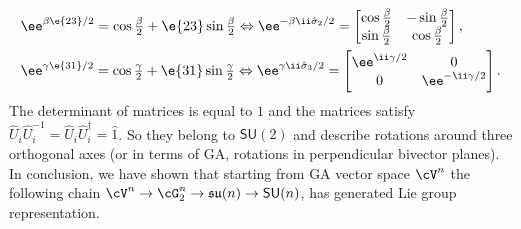 \begin{example}
\[\begin{split}
&\ee^{\beta\e{23}/2}=\cos\tfrac{\beta}{2}+\e{23}\sin\tfrac{\beta}{2}\Leftrightarrow\ee^{-\beta\ii\hat{\sigma}_2/2}=
\begin{bmatrix}\cos\tfrac{\beta}{2}&-\sin\tfrac{\beta}{2}\\\sin\tfrac{\beta}{2}&\cos\tfrac{\beta}{2}\end{bmatrix},\\
&\ee^{\gamma\e{31}/2}=\cos\tfrac{\gamma}{2}+\e{31}\sin\tfrac{\gamma}{2}\Leftrightarrow\ee^{\gamma\ii\hat{\sigma}_3/2}=
\begin{bmatrix}\ee^{\ii\gamma/2}&0\\0&\ee^{-\ii\gamma/2}\end{bmatrix}.
\end{split}\]
The determinant of matrices
is equal to $1$ and the matrices satisfy
$\hat{U}_i\hat{U}_i^{-1}=\hat{U}_i\hat{U}_i^{\dagger}=\hat{1}$. So
they belong to  $\mathsf{SU}(2)$  and describe rotations around
three orthogonal axes (or in terms of GA, rotations in
perpendicular bivector planes). In conclusion, we have shown that
starting from GA vector space $\cV^n$ the following chain
$\cV^n\rightarrow\cG_2^n\rightarrow\mathfrak{su}(n)\rightarrow\mathsf{SU}(n)$,
has generated Lie group representation.
\end{example}
%
